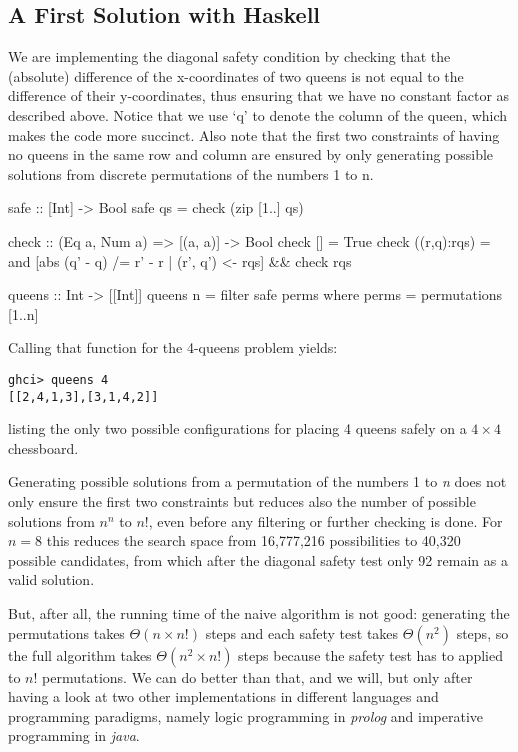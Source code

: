 \subsection{A First Solution with Haskell}

\begin{impl}
We are implementing the diagonal safety condition by checking that the (absolute) difference of the x-coordinates of two queens is not equal to the difference of their y-coordinates, thus ensuring that we have no constant factor as described above.
Notice that we use `q' to denote the column of the queen, which makes the code more succinct.
Also note that the first two constraints of having no queens in the same row and column are ensured by only generating possible solutions from discrete permutations of the numbers 1 to n. 
\end{impl}

\begin{haskellcode}
safe :: [Int] -> Bool
safe qs = check (zip [1..] qs)

check :: (Eq a, Num a) => [(a, a)] -> Bool
check [] = True
check ((r,q):rqs) =
    and [abs (q' - q) /= r' - r | (r', q') <- rqs] && check rqs

queens :: Int -> [[Int]]
queens n = filter safe perms
    where perms = permutations [1..n]
\end{haskellcode}

Calling that function for the 4-queens problem yields:
\begin{verbatim}
ghci> queens 4
[[2,4,1,3],[3,1,4,2]]
\end{verbatim}
listing the only two possible configurations for placing 4 queens safely on a $4 \times 4$ chessboard.

Generating possible solutions from a permutation of the numbers 1 to \emph{n} does not only ensure the first two constraints but reduces also the number of possible solutions from $n^n$ to $n!$, even before any filtering or further checking is done. For $n=8$ this reduces the search space from 16,777,216 possibilities to 40,320 possible candidates, from which after the diagonal safety test only 92 remain as a valid solution.

But, after all, the running time of the naive algorithm is not good: generating the permutations takes $\Theta(n \times n!)$ steps and each safety test takes $\Theta(n^2)$ steps, so the full algorithm takes $\Theta(n^2 \times n!)$ steps because the safety test has to applied to $n!$ permutations. We can do better than that, and we will, but only after having a look at two other implementations in different languages and programming paradigms, namely logic programming in \emph{prolog} and imperative programming in \emph{java}.


